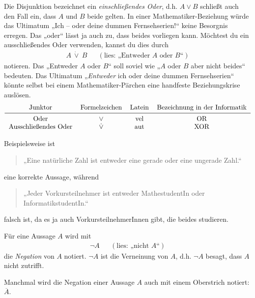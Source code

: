	
\begin{bem} \label{entwederoder}
    Die Disjunktion bezeichnet ein \emph{einschließendes Oder}, d.h. $A\lor B$ schließt auch den Fall ein, dass $A$ und $B$ beide gelten. In einer Mathematiker-Beziehung würde das Ultimatum „Ich -- oder deine dummen Fernsehserien!“ keine Besorgnis erregen. Das „oder“ lässt ja auch zu, dass beides vorliegen kann. Möchtest du ein ausschließendes Oder verwenden, kannst du dies durch
    \begin{align*}
        A\ \dot\lor\ B && (\text{lies: „Entweder $A$ oder $B$“})
    \end{align*}
    notieren. Das „Entweder $A$ oder $B$“ soll soviel wie „$A$ oder $B$ aber nicht beides“ bedeuten. Das Ultimatum „\emph{Entweder} ich oder deine dummen Fernsehserien“ könnte selbst bei einem Mathematiker-Pärchen eine handfeste Beziehungskrise auslösen.
    \[\begin{tabular}{cccc}
        Junktor &  Formelzeichen & Latein & Bezeichnung in der Informatik \\
        \midrule
        Oder &  $\lor$ & vel & OR \\
        Ausschließendes Oder & $\dot\lor$ & aut & XOR
    \end{tabular}\]
\end{bem}


\begin{bsp}
    Beispielsweise ist
    \begin{quote}
        „Eine natürliche Zahl ist entweder eine gerade oder eine ungerade Zahl.“
    \end{quote}
    eine korrekte Aussage, während
    \begin{quote}
        „Jeder Vorkursteilnehmer ist entweder MathestudentIn oder InformatikstudentIn.“
    \end{quote}
    falsch ist, da es ja auch VorkursteilnehmerInnen gibt, die beides studieren.
\end{bsp}


\begin{de}[Negation] 
    Für eine Aussage $A$ wird mit
    \begin{align*}
        \neg A   && (\text{lies: „nicht $A$“})
    \end{align*}
    die \emph{Negation} von $A$ notiert. $\neg A$ ist die Verneinung von $A$, d.h. $\neg A$ besagt, dass $A$ nicht zutrifft.
    
    Manchmal wird die Negation einer Aussage $A$ auch mit einem Oberstrich notiert: $\overline{A}$.
\end{de}


